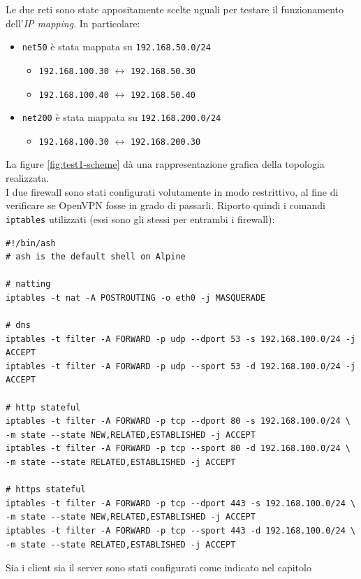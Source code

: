 Le due reti sono state appositamente scelte uguali per testare il funzionamento
dell'\textit{IP mapping}. In particolare:
\begin{itemize}
  \item \texttt{net50} è stata mappata su \texttt{192.168.50.0/24}
  \begin{itemize}
    \item \texttt{192.168.100.30} $\leftrightarrow$ \texttt{192.168.50.30}
    \item \texttt{192.168.100.40} $\leftrightarrow$ \texttt{192.168.50.40}
  \end{itemize}
  \item \texttt{net200} è stata mappata su \texttt{192.168.200.0/24}
  \begin{itemize}
    \item \texttt{192.168.100.30} $\leftrightarrow$ \texttt{192.168.200.30}
  \end{itemize}
\end{itemize}
La figure \ref{fig:test1-scheme} dà una rappresentazione grafica della topologia
realizzata.\\
I due firewall sono stati configurati volutamente in modo restrittivo, al fine
di verificare se OpenVPN fosse in grado di passarli. Riporto quindi i comandi
\texttt{iptables} utilizzati (essi sono gli stessi per entrambi i firewall):
\begin{verbatim}
#!/bin/ash
# ash is the default shell on Alpine

# natting
iptables -t nat -A POSTROUTING -o eth0 -j MASQUERADE

# dns
iptables -t filter -A FORWARD -p udp --dport 53 -s 192.168.100.0/24 -j ACCEPT
iptables -t filter -A FORWARD -p udp --sport 53 -d 192.168.100.0/24 -j ACCEPT

# http stateful
iptables -t filter -A FORWARD -p tcp --dport 80 -s 192.168.100.0/24 \
-m state --state NEW,RELATED,ESTABLISHED -j ACCEPT
iptables -t filter -A FORWARD -p tcp --sport 80 -d 192.168.100.0/24 \
-m state --state RELATED,ESTABLISHED -j ACCEPT

# https stateful
iptables -t filter -A FORWARD -p tcp --dport 443 -s 192.168.100.0/24 \
-m state --state NEW,RELATED,ESTABLISHED -j ACCEPT
iptables -t filter -A FORWARD -p tcp --sport 443 -d 192.168.100.0/24 \
-m state --state RELATED,ESTABLISHED -j ACCEPT
\end{verbatim}
Sia i client sia il server sono stati configurati come indicato nel capitolo
